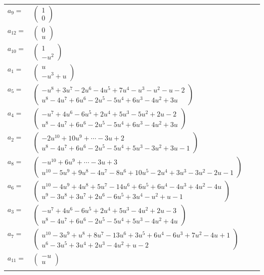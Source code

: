 \documentclass[1p]{elsarticle_modified}
\theoremstyle{definition}
\begin{document}
\begin{tabular}{m{7pt} m{180pt} m{7pt} m{180pt} }
\flushright $a_{9}=$&$\begin{pmatrix}1\\0\end{pmatrix}$ \\
\flushright $a_{12}=$&$\begin{pmatrix}0\\u\end{pmatrix}$ \\
\flushright $a_{10}=$&$\begin{pmatrix}1\\- u^2\end{pmatrix}$ \\
\flushright $a_{1}=$&$\begin{pmatrix}u\\- u^3+u\end{pmatrix}$ \\
\flushright $a_{5}=$&$\begin{pmatrix}- u^8+3 u^7-2 u^6-4 u^5+7 u^4- u^3- u^2- u-2\\u^8-4 u^7+6 u^6-2 u^5-5 u^4+6 u^3-4 u^2+3 u\end{pmatrix}$ \\
\flushright $a_{4}=$&$\begin{pmatrix}- u^7+4 u^6-6 u^5+2 u^4+5 u^3-5 u^2+2 u-2\\u^8-4 u^7+6 u^6-2 u^5-5 u^4+6 u^3-4 u^2+3 u\end{pmatrix}$ \\
\flushright $a_{2}=$&$\begin{pmatrix}-2 u^{10}+10 u^9+\cdots-3 u+2\\u^8-4 u^7+6 u^6-2 u^5-5 u^4+5 u^3-3 u^2+3 u-1\end{pmatrix}$ \\
\flushright $a_{8}=$&$\begin{pmatrix}- u^{10}+6 u^9+\cdots-3 u+3\\u^{10}-5 u^9+9 u^8-4 u^7-8 u^6+10 u^5-2 u^4+3 u^3-3 u^2-2 u-1\end{pmatrix}$ \\
\flushright $a_{6}=$&$\begin{pmatrix}u^{10}-4 u^9+4 u^8+5 u^7-14 u^6+6 u^5+6 u^4-4 u^3+4 u^2-4 u\\u^9-3 u^8+3 u^7+2 u^6-6 u^5+3 u^4- u^2+u-1\end{pmatrix}$ \\
\flushright $a_{3}=$&$\begin{pmatrix}- u^7+4 u^6-6 u^5+2 u^4+5 u^3-4 u^2+2 u-3\\u^8-4 u^7+6 u^6-2 u^5-5 u^4+5 u^3-4 u^2+4 u\end{pmatrix}$ \\
\flushright $a_{7}=$&$\begin{pmatrix}u^{10}-3 u^9+u^8+8 u^7-13 u^6+3 u^5+6 u^4-6 u^3+7 u^2-4 u+1\\u^6-3 u^5+3 u^4+2 u^3-4 u^2+u-2\end{pmatrix}$ \\
\flushright $a_{11}=$&$\begin{pmatrix}- u\\u\end{pmatrix}$\\&\end{tabular}
\end{document}
